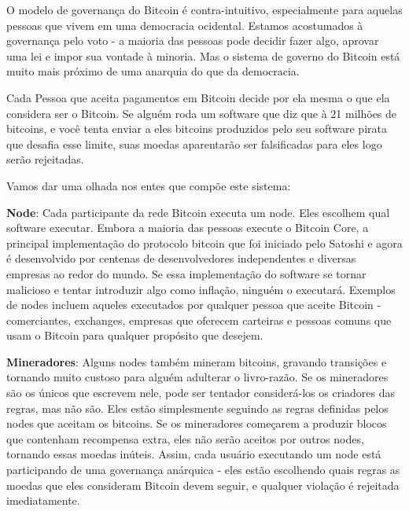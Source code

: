 O modelo de governança do Bitcoin é contra-intuitivo, especialmente para aquelas pessoas que vivem em uma democracia ocidental.
Estamos acostumados à governança pelo voto - a maioria das pessoas pode decidir fazer algo, aprovar uma lei e impor sua vontade à minoria.
Mas o sistema de governo do Bitcoin está muito mais próximo de uma anarquia do que da democracia. 

Cada Pessoa que aceita pagamentos em Bitcoin decide por ela mesma o que ela considera ser o Bitcoin.
Se alguém roda um software que diz que à 21 milhões de bitcoins, e você tenta enviar a eles bitcoins produzidos pelo seu software pirata que desafia esse limite, suas moedas aparentarão ser falsificadas para eles logo serão rejeitadas.

Vamos dar uma olhada nos entes que compõe este sistema:

\textbf{Node}: Cada participante da rede Bitcoin executa um node.
Eles escolhem qual software executar.
Embora a maioria das pessoas execute o Bitcoin Core, a principal implementação do protocolo bitcoin que foi iniciado pelo Satoshi e agora é desenvolvido por centenas de desenvolvedores independentes e diversas empresas ao redor do mundo.
Se essa implementação do software se tornar malicioso e tentar introduzir algo como inflação, ninguém o executará. 
Exemplos de nodes incluem aqueles executados por qualquer pessoa que aceite Bitcoin - comerciantes, exchanges, empresas que oferecem carteiras e pessoas comuns que usam o Bitcoin para qualquer propósito que desejem.

\textbf{Mineradores}: Alguns nodes também mineram bitcoins, gravando transições e tornando muito custoso para alguém adulterar o livro-razão.
Se os mineradores são os únicos que escrevem nele, pode ser tentador considerá-los os criadores das regras, mas não são. 
Eles estão simplesmente seguindo as regras definidas pelos nodes que aceitam os bitcoins.
Se os mineradores começarem a produzir blocos que contenham recompensa extra, eles não serão aceitos por outros nodes, tornando essas moedas inúteis. Assim, cada usuário executando um node está participando de uma governança anárquica - eles estão escolhendo quais regras as moedas que eles consideram Bitcoin devem seguir, e qualquer violação é rejeitada imediatamente.

